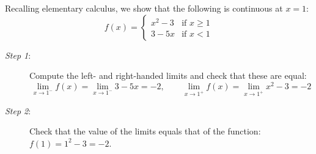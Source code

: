 

\begin{example}{}{}
Recalling elementary calculus, we show that the following is continuous at $x=1$:
\[f(x)=\begin{cases}
x^2-3&\text{if }x\ge 1\\
3-5x&\text{if }x<1
\end{cases}\]
\begin{description}
  \item[\normalfont\emph{Step 1}:] Compute the left- and right-handed limits and check that these are equal:
  \[\lim\limits_{x\to 1^-}f(x)=\lim\limits_{x\to 1^-}3-5x=-2,\qquad  \lim\limits_{x\to 1^+}f(x)=\lim\limits_{x\to 1^+}x^2-3=-2\]
  \item[\normalfont\emph{Step 2}:] Check that the value of the limits equals that of the function: $f(1)=1^2-3=-2$.
\end{description}
\end{example}\goodbreak


